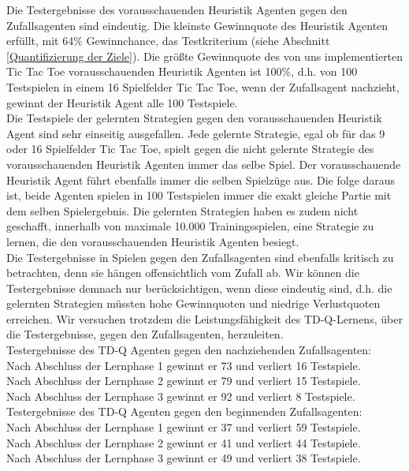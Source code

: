 Die Testergebnisse des vorausschauenden Heuristik Agenten gegen den Zufallsagenten sind eindeutig. Die kleinste Gewinnquote des Heuristik Agenten erfüllt, mit 64\% Gewinnchance, das Testkriterium (siehe Abschnitt \ref{Quantifizierung der Ziele}). Die größte Gewinnquote des von uns implementierten Tic Tac Toe vorausschauenden Heuristik Agenten ist 100\%, d.h. von 100 Testspielen in einem 16 Spielfelder Tic Tac Toe, wenn der Zufallsagent nachzieht, gewinnt der Heuristik Agent alle 100 Testspiele. \\

Die Testspiele der gelernten Strategien gegen den vorausschauenden Heuristik Agent sind sehr einseitig ausgefallen. Jede gelernte Strategie, egal ob für das 9 oder 16 Spielfelder Tic Tac Toe, spielt gegen die nicht gelernte Strategie des vorausschauenden Heuristik Agenten immer das selbe Spiel. Der vorausschauende Heuristik Agent führt ebenfalls immer die selben Spielzüge aus. Die folge daraus ist, beide Agenten spielen in 100 Testspielen immer die exakt gleiche Partie mit dem selben Spielergebnis. Die gelernten Strategien haben es zudem nicht geschafft, innerhalb von maximale 10.000 Trainingsspielen, eine Strategie zu lernen, die den vorausschauenden Heuristik Agenten besiegt. \\

Die Testergebnisse in Spielen gegen den Zufallsagenten sind ebenfalls kritisch zu betrachten, denn sie hängen offensichtlich vom Zufall ab. Wir können die Testergebnisse demnach nur berücksichtigen, wenn diese eindeutig sind, d.h. die gelernten Strategien müssten hohe Gewinnquoten und niedrige Verlustquoten erreichen. Wir versuchen trotzdem die Leistungsfähigkeit des TD-Q-Lernens, über die Testergebnisse, gegen den Zufallsagenten, herzuleiten. \\

Testergebnisse des TD-Q Agenten gegen den nachziehenden Zufallsagenten: \\
Nach Abschluss der Lernphase 1 gewinnt er 73 und verliert 16 Testspiele. \\
Nach Abschluss der Lernphase 2 gewinnt er 79 und verliert 15 Testspiele. \\ 
Nach Abschluss der Lernphase 3 gewinnt er 92 und verliert 8 Testspiele. \\

Testergebnisse des TD-Q Agenten gegen den beginnenden Zufallsagenten: \\
Nach Abschluss der Lernphase 1 gewinnt er 37 und verliert 59 Testspiele. \\
Nach Abschluss der Lernphase 2 gewinnt er 41 und verliert 44 Testspiele. \\ 
Nach Abschluss der Lernphase 3 gewinnt er 49 und verliert 38 Testspiele. \\


